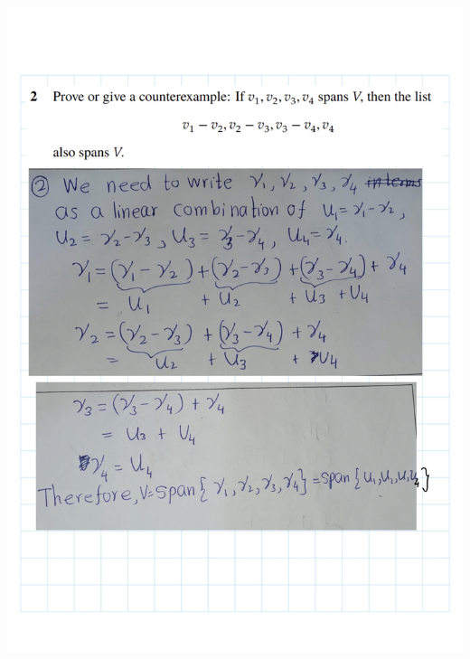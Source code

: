 \documentclass[
]{book}
\theoremstyle{definition}
\theoremstyle{definition}
\theoremstyle{definition}
\theoremstyle{definition}
\theoremstyle{remark}
\begin{document}
\includegraphics{fig/Ex2A/Ex2A-02.png}
\end{document}
